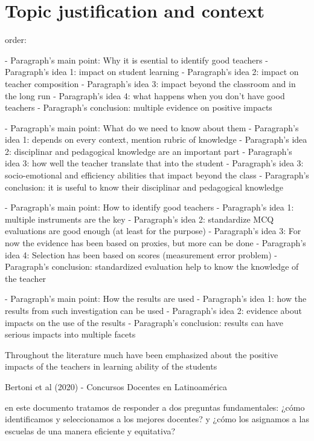 \section{Topic justification and context}

order:

- Paragraph's main point: Why it is esential to identify good teachers
- Paragraph's idea 1: impact on student learning
- Paragraph's idea 2: impact on teacher composition
- Paragraph's idea 3: impact beyond the classroom and in the long run
- Paragraph's idea 4: what happens when you don't have good teachers
- Paragraph's conclusion: multiple evidence on positive impacts

- Paragraph's main point: What do we need to know about them
- Paragraph's idea 1: depends on every context, mention rubric of knowledge
- Paragraph's idea 2: disciplinar and pedagogical knowledge are an important part
- Paragraph's idea 3: how well the teacher translate that into the student
- Paragraph's idea 3: socio-emotional and efficiency abilities that impact beyond the class
- Paragraph's conclusion: it is useful to know their disciplinar and pedagogical knowledge 

- Paragraph's main point: How to identify good teachers
- Paragraph's idea 1: multiple instruments are the key
- Paragraph's idea 2: standardize MCQ evaluations are good enough (at least for the purpose)
- Paragraph's idea 3: For now the evidence has been based on proxies, but more can be done
- Paragraph's idea 4: Selection has been based on scores (measurement error problem)
- Paragraph's conclusion: standardized evaluation help to know the knowledge of the teacher

- Paragraph's main point: How the results are used
- Paragraph's idea 1: how the results from such investigation can be used
- Paragraph's idea 2: evidence about impacts on the use of the results
- Paragraph's conclusion: results can have serious impacts into multiple facets


Throughout the literature much have been emphasized about the positive impacts of the teachers in learning ability of the students 




Bertoni et al (2020) - Concursos Docentes en Latinoamérica

en este documento tratamos de responder a dos preguntas fundamentales: ¿cómo identificamos y seleccionamos a los mejores docentes? y ¿cómo los asignamos a las escuelas de una manera eficiente y equitativa? 

